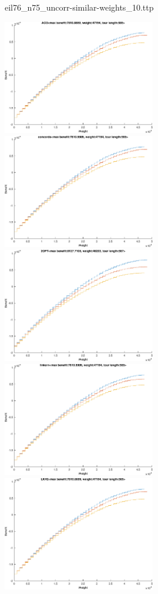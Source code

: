 \documentclass{article}
\begin{document}
\newpage
eil76\_n75\_uncorr-similar-weights\_10.ttp

\noindent
\includegraphics[width=0.5\textwidth]{eil76figs/eil76_n75_uncorr-similar-weights_10.ttp.aco.txt.atsf.eps}
\includegraphics[width=0.5\textwidth]{eil76figs/eil76_n75_uncorr-similar-weights_10.ttp.con.txt.atsf.eps}
\includegraphics[width=0.5\textwidth]{eil76figs/eil76_n75_uncorr-similar-weights_10.ttp.inv.txt.atsf.eps}
\includegraphics[width=0.5\textwidth]{eil76figs/eil76_n75_uncorr-similar-weights_10.ttp.lkh.txt.atsf.eps}
\includegraphics[width=0.5\textwidth]{eil76figs/eil76_n75_uncorr-similar-weights_10.ttp.lkh2.txt.atsf.eps}
\end{document}

